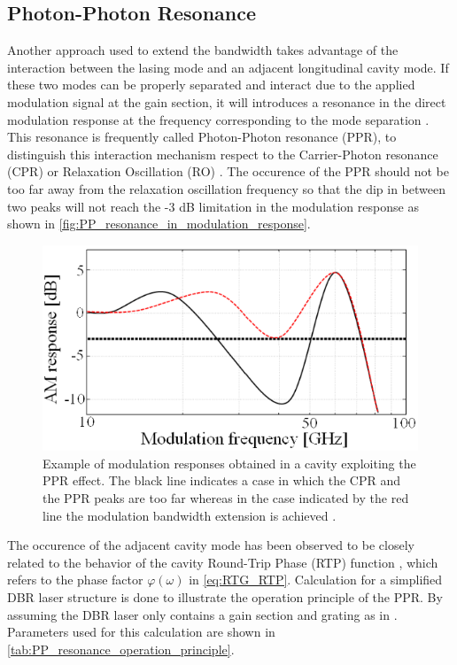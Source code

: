 \subsection{Photon-Photon Resonance}\label{subsec:pp_resonance}
Another approach used to extend the bandwidth takes advantage of the interaction between the lasing mode and an adjacent longitudinal cavity mode. If these two modes can be properly separated and interact due to the applied modulation signal at the gain section, it will introduces a resonance in the direct modulation response at the frequency corresponding to the mode separation \cite{montrosset2014laser}. This resonance is frequently called Photon-Photon resonance (PPR), to distinguish this interaction mechanism respect to the Carrier-Photon resonance (CPR) or Relaxation Oscillation (RO) \cite{montrosset2014laser}. The occurence of the PPR should not be too far away from the relaxation oscillation frequency so that the dip in between two peaks will not reach the -3 dB limitation in the modulation response as shown in \autoref{fig:PP_resonance_in_modulation_response}.

\begin{figure}[H]
    \centering
    \includegraphics[width=.6\linewidth]{figures/PP_resonance_in_modulation_response.png}
    \caption{Example of modulation responses obtained in a cavity exploiting the PPR effect. The black line indicates a case in which the CPR and the PPR peaks are too far whereas in the case indicated by the red line the modulation bandwidth extension is achieved \cite{montrosset2014laser}.}
    \label{fig:PP_resonance_in_modulation_response}
\end{figure}

The occurence of the adjacent cavity mode has been observed to be closely related to the behavior of the cavity Round-Trip Phase (RTP) function \cite{reithmaier2005modulation}, which refers to the phase factor $\varphi(\omega)$ in \autoref{eq:RTG_RTP}. Calculation for a simplified DBR laser structure is done to illustrate the operation principle of the PPR. By assuming the DBR laser only contains a gain section and grating as in \cite{montrosset2014laser}. Parameters used for this calculation are shown in \autoref{tab:PP_resonance_operation_principle}.

